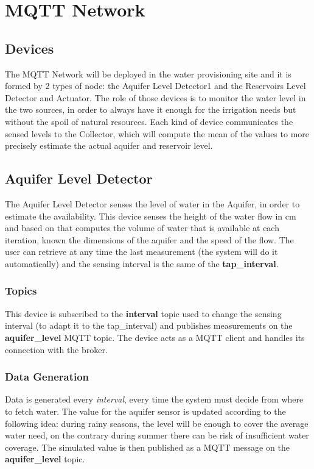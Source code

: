 \section{MQTT Network}

\subsection{Devices}
The MQTT Network will be deployed in the water provisioning site and it is formed by 2 types of node: the Aquifer Level Detector1 and the Reservoirs Level Detector and Actuator. The role of those devices is to monitor the water level in the two sources, in order to always have it enough for the irrigation needs but without the spoil of natural resources. Each kind of device communicates the sensed levels to the Collector, which will compute the mean of the values to more precisely estimate the actual aquifer and reservoir level.


\subsection{Aquifer Level Detector}
The Aquifer Level Detector senses the level of water in the Aquifer, in order to estimate the availability. This device senses the height of the water flow in cm and based on that computes the volume of water that is available at each iteration, known the dimensions of the aquifer and the speed of the flow. The user can retrieve at any time the last measurement (the system will do it automatically) and the sensing interval is the same of the \textbf{tap\_interval}.

\subsubsection{Topics}
This device is subscribed to the \textbf{interval} topic used to change the sensing interval (to adapt it to the tap\_interval) and publishes measurements on the \textbf{aquifer\_level} MQTT topic.
The device acts as a MQTT client and handles its connection with the broker.

\subsubsection{Data Generation}
Data is generated every \textit{interval}, every time the system must decide from where to fetch water. The value for the aquifer sensor is updated according to the following idea: during rainy seasons, the level will be enough to cover the average water need, on the contrary during summer there can be risk of insufficient water coverage. The simulated value is then published as a MQTT message on the \textbf{aquifer\_level} topic.

